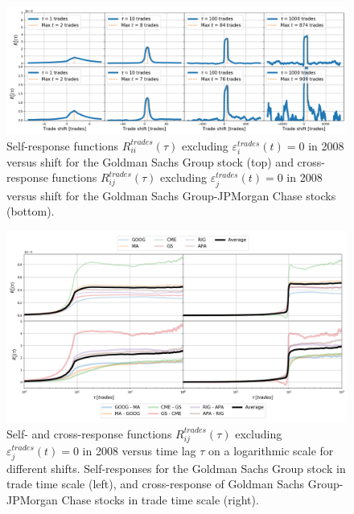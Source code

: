 \begin{figure}[htbp]
    \centering
    \includegraphics[width=\textwidth]{figures/04_shift_trade.png}
    \caption{Self-response functions $R_{ii}^{trades}\left(\tau\right)$
             excluding $\varepsilon^{trades}_{i}\left(t\right) = 0$ in 2008
             versus shift for the Goldman Sachs Group stock (top) and
             cross-response functions $R_{ij}^{trades}\left(\tau\right)$
             excluding $\varepsilon^{trades}_{j}\left(t\right) = 0$ in 2008
             versus shift for the Goldman Sachs Group-JPMorgan Chase stocks
             (bottom).}
    \label{fig:shift_trade_scale}
\end{figure}

\begin{figure}[htbp]
    \centering
    \includegraphics[width=\textwidth]{figures/04_shift_responses_trade.png}
    \caption{Self- and cross-response functions
             $R^{trades}_{ij}\left(\tau\right)$ excluding
             $\varepsilon^{trades}_{j}\left(t\right) = 0$ in 2008 versus time
             lag $\tau$ on a logarithmic scale for different shifts.
             Self-responses for the Goldman Sachs Group stock in trade time
             scale (left), and cross-response of Goldman Sachs Group-JPMorgan
             Chase stocks in trade time scale (right).}
    \label{fig:shift_responses_trade_scale}
\end{figure}

